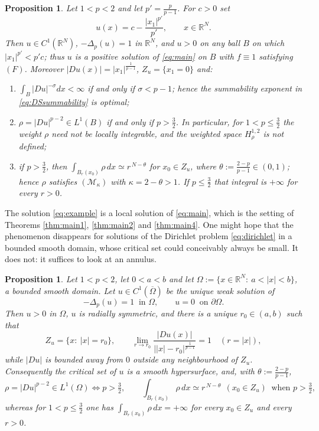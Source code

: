 \documentclass[reqno]{amsart}
\theoremstyle{plain}
\newtheorem{proposition}[theorem]{Proposition}
\theoremstyle{definition}
\theoremstyle{remark}
\newcommand{\R}{\mathbb{R}}
\newcommand{\Lap}[1]{\Delta_{#1}}
\begin{document}
\begin{proposition}\label{prop:sharp}
Let $1<p<2$ and let $p'=\frac{p}{p-1}$. For $c>0$ set
\begin{equation}\label{eq:example}
u(x)=c-\frac{|x_1|^{p'}}{p'},\qquad x\in\R^N .
\end{equation}
Then $u\in C^1(\R^N)$, $-\Lap{p}(u)=1$ in $\R^N$, and $u>0$ on any ball $B$ on which
$|x_1|^{p'}<p'c$; thus $u$ is a positive solution of \eqref{eq:main} on $B$ with $f\equiv1$
satisfying $(F)$. Moreover $|Du(x)|=|x_1|^{\frac1{p-1}}$, $Z_u=\{x_1=0\}$ and:
\begin{enumerate}[label=\rm(\roman*)]
\item $\int_B|Du|^{-\sigma}dx<\infty$ if and only if $\sigma<p-1$; hence the summability exponent in
\eqref{eq:DSsummability} is optimal;
\item $\rho=|Du|^{p-2}\in L^1(B)$ if and only if $p>\frac32$. In particular, for
$1<p\le\frac32$ the weight $\rho$ need not be locally integrable, and the weighted space
$H^{1,2}_{\rho}$ is not defined;
\item if $p>\frac32$, then $\int_{B_r(x_0)}\rho\,dx\simeq r^{\,N-\theta}$ for $x_0\in Z_u$, where
$\theta:=\frac{2-p}{p-1}\in(0,1)$; hence $\rho$ satisfies $(\mathcal M_\kappa)$ with
$\kappa=2-\theta>1$. If $p\le\frac32$ that integral is $+\infty$ for every $r>0$.
\end{enumerate}
\end{proposition}

The solution \eqref{eq:example} is a local solution of \eqref{eq:main}, which is the setting of
Theorems \ref{thm:main1}, \ref{thm:main2} and \ref{thm:main4}. One might hope that the phenomenon
disappears for solutions of the Dirichlet problem \eqref{eq:dirichlet} in a bounded smooth domain,
whose critical set could conceivably always be small. It does not: it suffices to look at an
annulus.

\begin{proposition}\label{prop:annulus}
Let $1<p<2$, let $0<a<b$ and let $\Omega:=\{x\in\R^N:\ a<|x|<b\}$, a bounded smooth domain. Let
$u\in C^1(\overline\Omega)$ be the unique weak solution of
\begin{equation}\label{eq:annulus}
-\Lap{p}(u)=1\ \text{ in }\Omega,\qquad u=0\ \text{ on }\partial\Omega .
\end{equation}
Then $u>0$ in $\Omega$, $u$ is radially symmetric, and there is a unique $r_0\in(a,b)$ such that
\[
Z_u=\{x:\ |x|=r_0\},\qquad
\lim_{r\to r_0}\frac{|Du(x)|}{\big||x|-r_0\big|^{\frac1{p-1}}}=1\quad (r=|x|) ,
\]
while $|Du|$ is bounded away from $0$ outside any neighbourhood of $Z_u$. Consequently the critical
set of $u$ is a smooth hypersurface, and, with $\theta:=\frac{2-p}{p-1}$,
\[
\rho=|Du|^{p-2}\in L^1(\Omega)\iff p>\tfrac32,\qquad
\int_{B_r(x_0)}\rho\,dx\simeq r^{\,N-\theta}\ \ (x_0\in Z_u)\ \text{ when }p>\tfrac32 ,
\]
whereas for $1<p\le\frac32$ one has $\int_{B_r(x_0)}\rho\,dx=+\infty$ for every $x_0\in Z_u$ and
every $r>0$.
\end{proposition}
\end{document}
